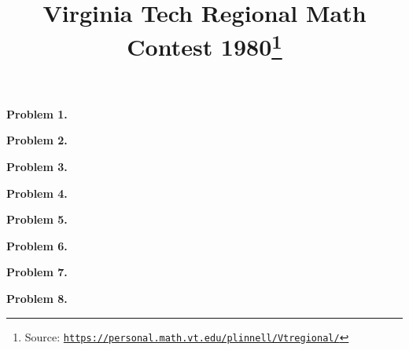 \documentclass[10pt]{article}
\newcommand{\vtrmc}{https://personal.math.vt.edu/plinnell/Vtregional/}
\newcommand{\source}{\href{\vtrmc}{\texttt{\vtrmc}}}
\newcommand{\problem}[1]{\textbf{Problem #1.}}
\newcommand{\inputproblem}[2]{}
\begin{document}
\title{Virginia Tech Regional Math Contest 1980\footnote{Source: \source}}
\author{\vspace{-2ex}}
\date{\vspace{-6ex}} %
\maketitle

\problem{1}
\inputproblem{1980}{1}

\problem{2}
\inputproblem{1980}{2}

\problem{3}
\inputproblem{1980}{3}

\problem{4}
\inputproblem{1980}{4}

\problem{5}
\inputproblem{1980}{5}

\problem{6}
\inputproblem{1980}{6}

\problem{7}
\inputproblem{1980}{7}

\problem{8}
\inputproblem{1980}{8}
\end{document}
